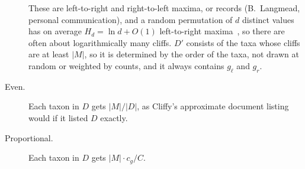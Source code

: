 \begin{description}
These are left-to-right and right-to-left maxima, or records (B.~Langmead, personal communication), and a random permutation of $d$ distinct values has on average $H_d = \ln d + O(1)$ left-to-right maxima~\cite{Ren62}, so there are often about logarithmically many cliffs.
$D'$ consists of the taxa whose cliffs are at least $|M|$, so it is determined by the order of the taxa, not drawn at random or weighted by counts, and it always contains $g_\ell$ and $g_r$.
\item[Even.] Each taxon in $D$ gets $|M|/|D|$, as Cliffy's approximate document listing would if it listed $D$ exactly.
\item[Proportional.] Each taxon in $D$ gets $|M| \cdot c_g / C$.
\end{description}

\begin{table}[t]
\centering
\caption{Matches and credit schemes. $M$ is a match, $c_g$ is the number of its occurrences in taxon $g$, $C = \sum_g c_g$, $D$ is the set of taxa containing it, and $g_\ell$ and $g_r$ are the leftmost and rightmost of them in the order of the leaves of the taxonomy.}
\label{tab:schemes}
\end{table}

